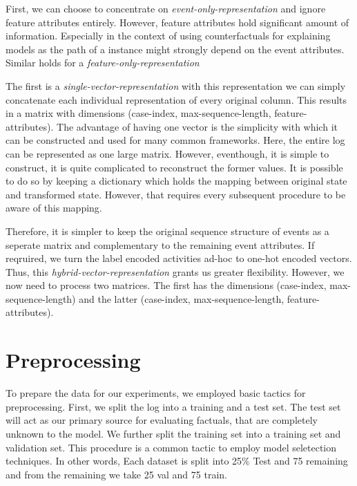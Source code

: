 \documentclass[./../../paper.tex]{subfiles}
\begin{document}
First, we can choose to concentrate on \emph{event-only-representation} and ignore feature attributes entirely. However, feature attributes hold significant amount of information. Especially in the context of using counterfactuals for explaining models as the path of a \gls{instance} might strongly depend on the event attributes. Similar holds for a \emph{feature-only-representation} 

The first is a \emph{single-vector-representation} with this representation we can simply concatenate each individual representation of every original column. This results in a matrix with dimensions (case-index, max-sequence-length, feature-attributes). The advantage of having one vector is the simplicity with which it can be constructed and used for many common frameworks. Here, the entire log can be represented as one large matrix. However, eventhough, it is simple to construct, it is quite complicated to reconstruct the former values. It is possible to do so by keeping a dictionary which holds the mapping between original state and transformed state. However, that requires every subsequent procedure to be aware of this mapping. 

Therefore, it is simpler to keep the original sequence structure of events as a seperate matrix and complementary to the remaining event attributes. If reqruired, we turn the label encoded activities ad-hoc to one-hot encoded vectors. Thus, this \emph{hybrid-vector-representation} grants us greater flexibility. However, we now need to process two matrices. The first has the dimensions (case-index, max-sequence-length) and the latter (case-index, max-sequence-length, feature-attributes). 

\section{Preprocessing}
\label{sec:preprocessing}

To prepare the data for our experiments, we employed basic tactics for preprocessing. First, we split the log into a training and a test set. The test set will act as our primary source for evaluating factuals, that are completely unknown to the model. We further split the training set into a training set and validation set. This procedure is a common tactic to employ model seletection techniques.  In other words, Each dataset is split into 25\% Test and 75 remaining and from the remaining we take 25 val and 75 train.
\end{document}

